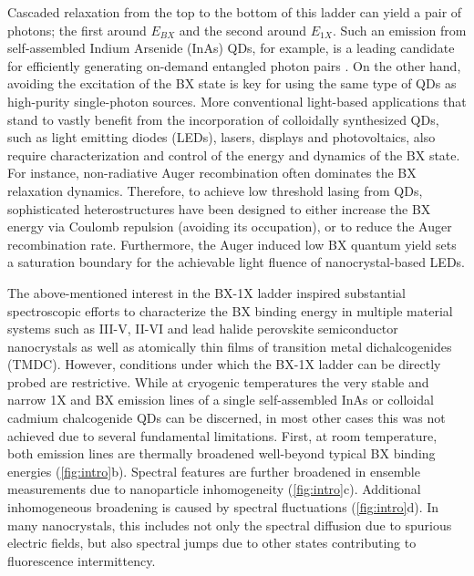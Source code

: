 \documentclass[journal=nalefd, manuscript=letter, layout=twocolumn]{achemso}
\begin{document}
Cascaded relaxation from the top to the bottom of this ladder can yield a pair of photons; the first around $E_{BX}$ and the second around $E_{1X}$. 
Such an emission from self-assembled Indium Arsenide (InAs) QDs, for example, is a leading candidate for efficiently generating on-demand entangled photon pairs \cite{Senellart2017}. 
On the other hand, avoiding the excitation of the BX state is key for using the same type of QDs as high-purity single-photon sources\cite{Senellart2017}.
More conventional light-based applications that stand to vastly benefit from the incorporation of colloidally synthesized QDs, such as light emitting diodes (LEDs)\cite{Colvin1994,Shirasaki2013}, lasers\cite{Klimov2000,Pelton2018}, displays\cite{Jang2010} and photovoltaics\cite{Kramer2011}, also require characterization and control of the energy and dynamics of the BX state. For instance, non-radiative Auger recombination often dominates the BX relaxation dynamics\cite{Nair2011}. Therefore, to achieve low threshold lasing from QDs, sophisticated heterostructures have been designed to either increase the BX energy via Coulomb repulsion (avoiding its occupation)\cite{Nanda2007}, or to reduce the Auger recombination rate\cite{Todescato2012}. Furthermore, the Auger induced low BX quantum yield sets a saturation boundary for the achievable light fluence of nanocrystal-based LEDs\cite{Wu2019}. 

The above-mentioned interest in the BX-1X ladder inspired substantial spectroscopic efforts to characterize the BX binding energy in multiple material systems such as III-V\cite{Dekel2000,Stevenson2006,Akopian2006}, II-VI\cite{Achermann2003,Oron2006} and lead halide perovskite\cite{Castaneda2016,Shulenberger2019} semiconductor nanocrystals as well as atomically thin films of transition metal dichalcogenides (TMDC)\cite{You2015}. However, conditions under which the BX-1X ladder can be directly probed are restrictive. While at cryogenic temperatures the very stable and narrow 1X and BX emission lines of a single self-assembled InAs or colloidal cadmium chalcogenide QDs can be discerned\cite{Stevenson2006,Akopian2006,Osovsky2009}, in most other cases this was not achieved due to several fundamental limitations. First, at room temperature, both emission lines are thermally broadened well-beyond typical BX binding energies (\autoref{fig:intro}b). Spectral features are further broadened in ensemble measurements due to nanoparticle inhomogeneity  (\autoref{fig:intro}c). Additional inhomogeneous broadening is caused by spectral fluctuations (\autoref{fig:intro}d). In many nanocrystals, this includes not only the spectral diffusion due to spurious electric fields, but also spectral jumps due to other states contributing to fluorescence intermittency\cite{Beyler2013, Antolinez2019}.
\end{document}

